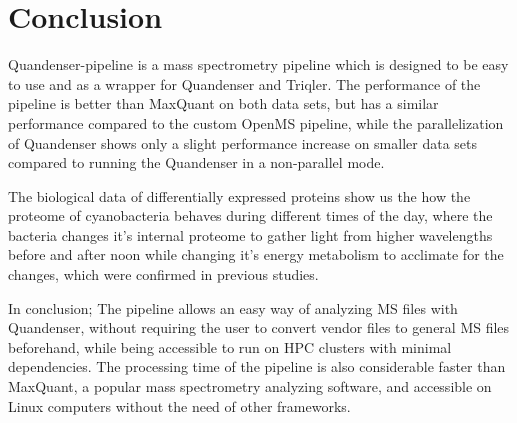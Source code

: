 \section{Conclusion}

Quandenser-pipeline is a mass spectrometry pipeline which is designed to be easy to use and as a wrapper for Quandenser and Triqler. The performance of the pipeline is better than MaxQuant on both data sets, but has a similar performance compared to the custom OpenMS pipeline, while the parallelization of Quandenser shows only a slight performance increase on smaller data sets compared to running the Quandenser in a non-parallel mode.

The biological data of differentially expressed proteins show us the how the proteome of cyanobacteria behaves during different times of the day, where the bacteria changes it's internal proteome to gather light from higher wavelengths before and after noon while changing it's energy metabolism to acclimate for the changes, which were confirmed in previous studies.

In conclusion; The pipeline allows an easy way of analyzing MS files with Quandenser, without requiring the user to convert vendor files to general MS files beforehand, while being accessible to run on HPC clusters with minimal dependencies. The processing time of the pipeline is also considerable faster than MaxQuant, a popular mass spectrometry analyzing software, and accessible on Linux computers without the need of other frameworks.
